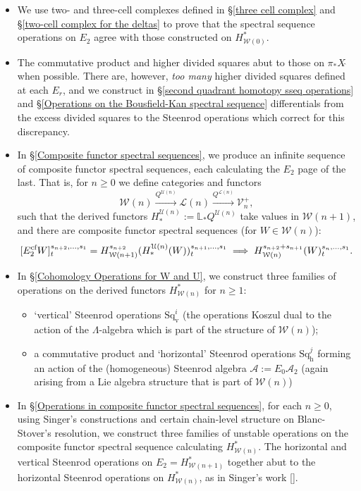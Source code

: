 \documentclass[11pt]{amsart} \renewcommand{\baselinestretch}{1.2}
\theoremstyle{plain}
\theoremstyle{definition}
\renewcommand{\to}{\longrightarrow}
\newcommand{\calA}{\mathcal{A}}
\newcommand{\calV}{\mathcal{V}}
\newcommand{\calw}{\mathcal{W}}
\newcommand{\calu}{\mathcal{U}}
\newcommand{\cala}{\mathcal{A}}
\newcommand{\call}{\mathcal{L}}
\newcommand{\vect}[2]{\calV^{#1}_{#2}}
\newcommand{\LieSteen}{\calA}
\newcommand{\E}[5]{[E^{#1}_{#2}#3]^{#4}_{#5}}
\newcommand{\dver}{_\mathrm{v}}
\newcommand{\dhor}{_\mathrm{h}}
\newcommand{\Sqh}{\mathrm{Sq}\dhor}
\newcommand{\Sqv}{\mathrm{Sq}\dver}
\begin{document}
\begin{Introduction}
\begin{itemize}
\item We use two- and three-cell complexes defined in \S\ref{three cell complex} and \S\ref{two-cell complex for the deltas} to prove that the spectral sequence operations  on $E_2$ agree with those constructed on $H^*_{\calw(0)}$.
\item The commutative product and higher divided squares abut to those on $\pi_*X\hat{\ }$ when possible. There are, however, \emph{too many} higher divided squares  defined at each $E_r$, and we construct in \S\ref{second quadrant homotopy sseq operations} and \S\ref{Operations on the Bousfield-Kan spectral sequence} differentials from the excess divided squares to the Steenrod operations which correct for this discrepancy.
\item  In \S\ref{Composite functor spectral sequences}, we produce an infinite sequence of composite functor spectral sequences, each calculating the $E_2$ page of the last. That is, for $n\geq0$ we define categories and functors 
\[\calw(n)\overset{Q^{\calu(n)}}{\to}\call(n)\overset{Q^{\call(n)}}{\to}\vect{+}{n},\]
such that the derived functors $H_*^{\calu(n)}:=\mathbb{L}_*Q^{\calu(n)}$ take values in $\calw(n+1)$, and there are composite functor spectral sequences (for $W\in\calw(n)$):
\[\E{\textup{cf}}{2}{W}{s_{n+2},\ldots,s_1}{t}=H^{s_{n+2}}_{\calw(n+1)}(H_*^{\calu(n)}(W))^{s_{n+1},\ldots,s_1}_t\implies H^{s_{n+2}+s_{n+1}}_{\calw(n)} (W)_t^{s_n,\ldots,s_1}.\]
\item In \S\ref{Cohomology Operations for W and U}, we construct three families of operations on the derived functors $H^*_{\calw(n)}$ for $n\geq1$:
\begin{itemize}
\item `vertical' Steenrod operations  $\Sqv^i$ (the operations Koszul dual to the action of the $\Lambda$-algebra which is part of the structure of $\calw(n)$);
\item a commutative product and `horizontal' Steenrod operations $\Sqh^j$ forming an action of the (homogeneous) Steenrod algebra $\LieSteen:=E_0\cala_2$ (again arising from a Lie algebra structure that is part of $\calw(n)$)
\end{itemize}
\item In \S\ref{Operations in composite functor spectral sequences}, for each $n\geq0$, using Singer's constructions and certain  chain-level structure on Blanc-Stover's resolution,  we construct three families of unstable operations on the composite functor spectral sequence calculating $H^*_{\calw(n)}$.  The horizontal and vertical Steenrod operations on $E_2=H^*_{\calw(n+1)}$ together abut to the horizontal Steenrod operations on $H^*_{\calw(n)}$, as in Singer's work [].

\end{itemize}
\end{Introduction}
\end{document}
